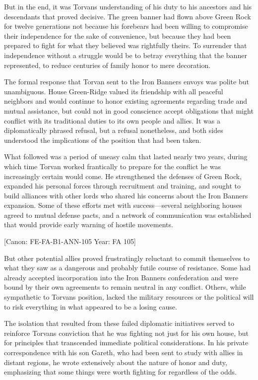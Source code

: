 But in the end, it was Torvan\textquotesingle s understanding of his
duty to his ancestors and his descendants that proved decisive. The
green banner had flown above Green Rock for twelve generations not
because his forebears had been willing to compromise their independence
for the sake of convenience, but because they had been prepared to fight
for what they believed was rightfully theirs. To surrender that
independence without a struggle would be to betray everything that the
banner represented, to reduce centuries of family honor to mere
decoration.

The formal response that Torvan sent to the Iron
Banner\textquotesingle s envoys was polite but unambiguous. House
Green-Ridge valued its friendship with all peaceful neighbors and would
continue to honor existing agreements regarding trade and mutual
assistance, but could not in good conscience accept obligations that
might conflict with its traditional duties to its own people and allies.
It was a diplomatically phrased refusal, but a refusal nonetheless, and
both sides understood the implications of the position that had been
taken.

What followed was a period of uneasy calm that lasted nearly two years,
during which time Torvan worked frantically to prepare for the conflict
he was increasingly certain would come. He strengthened the defenses of
Green Rock, expanded his personal forces through recruitment and
training, and sought to build alliances with other lords who shared his
concerns about the Iron Banner\textquotesingle s expansion. Some of
these efforts met with success---several neighboring houses agreed to
mutual defense pacts, and a network of communication was established
that would provide early warning of hostile movements.

{[}Canon: FE-FA-B1-ANN-105 \textbar{} Year: FA 105{]}

But other potential allies proved frustratingly reluctant to commit
themselves to what they saw as a dangerous and probably futile course of
resistance. Some had already accepted incorporation into the Iron
Banner\textquotesingle s confederation and were bound by their own
agreements to remain neutral in any conflict. Others, while sympathetic
to Torvan\textquotesingle s position, lacked the military resources or
the political will to risk everything in what appeared to be a losing
cause.

The isolation that resulted from these failed diplomatic initiatives
served to reinforce Torvan\textquotesingle s conviction that he was
fighting not just for his own house, but for principles that transcended
immediate political considerations. In his private correspondence with
his son Gareth, who had been sent to study with allies in distant
regions, he wrote extensively about the nature of honor and duty,
emphasizing that some things were worth fighting for regardless of the
odds.

